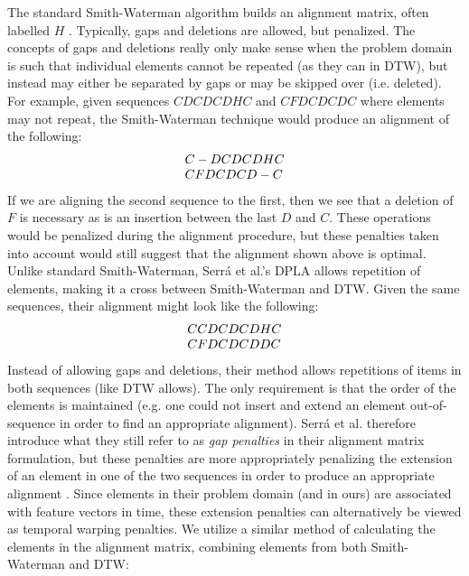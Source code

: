 \documentclass[a4paper,12pt]{report} 	%
\numberwithin{figure}{chapter}
\numberwithin{table}{chapter}
\numberwithin{equation}{chapter}
\begin{document}
\begin{flushleft}
The standard Smith-Waterman algorithm builds an alignment matrix, often labelled $H$ \cite{smith1981textordfeminineidentification}. Typically, gaps and deletions are allowed, but penalized. The concepts of gaps and deletions really only make sense when the problem domain is such that individual elements cannot be repeated (as they can in DTW), but instead may either be separated by gaps or may be skipped over (i.e. deleted). For example, given sequences $CDCDCDHC$ and $CFDCDCDC$ where elements may not repeat, the Smith-Waterman technique would produce an alignment of the following:
\begin{equation}
\begin{array}{l l}
C-DCDCDHC\\
CFDCDCD-C
\end{array}
\end{equation}
If we are aligning the second sequence to the first, then we see that a deletion of $F$ is necessary as is an insertion between the last $D$ and $C$. These operations would be penalized during the alignment procedure, but these penalties taken into account would still suggest that the alignment shown above is optimal. Unlike standard Smith-Waterman, Serr\'a et al.'s DPLA allows repetition of elements, making it a cross between Smith-Waterman and DTW. Given the same sequences, their alignment might look like the following:
\begin{equation}
\begin{array}{l l}
CCDCDCDHC\\
CFDCDCDDC
\end{array}
\end{equation}
Instead of allowing gaps and deletions, their method allows repetitions of items in both sequences (like DTW allows). The only requirement is that the order of the elements is maintained (e.g. one could not insert and extend an element out-of-sequence in order to find an appropriate alignment). Serr\'a et al. therefore introduce what they still refer to as \emph{gap penalties} in their alignment matrix formulation, but these penalties are more appropriately penalizing the extension of an element in one of the two sequences in order to produce an appropriate alignment \cite{serra2008chroma}. Since elements in their problem domain (and in ours) are associated with feature vectors in time, these extension penalties can alternatively be viewed as temporal warping penalties. We utilize a similar method of calculating the elements in the alignment matrix, combining elements from both Smith-Waterman and DTW:

\end{flushleft}
\end{document}
